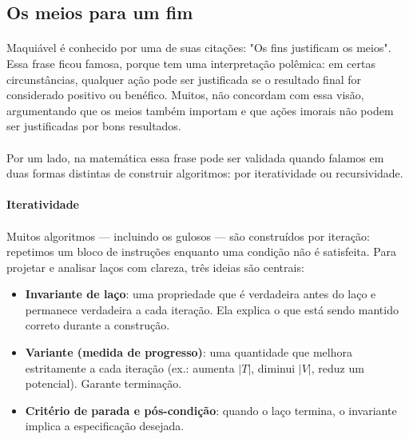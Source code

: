 \documentclass[12pt,a4paper]{article}
\def\emph#1{#1}%
\begin{document}
\subsection{Os meios para um fim}

\paragraph{}
Maquiável é conhecido por uma de suas citações: "Os fins justificam os meios". Essa frase ficou famosa, porque tem uma interpretação polêmica: em certas circunstâncias, qualquer ação pode ser justificada se o resultado final for considerado positivo ou benéfico. Muitos, não concordam com essa visão, argumentando que os meios também importam e que ações imorais não podem ser justificadas por bons resultados.

\paragraph{}
Por um lado, na matemática essa frase pode ser validada quando falamos em duas formas distintas de construir algoritmos: por \emph{iteratividade} ou \emph{recursividade}.

\paragraph{Iteratividade}
\paragraph{}
Muitos algoritmos — incluindo os gulosos — são construídos por \emph{iteração}: repetimos um bloco de instruções enquanto uma condição não é satisfeita. Para projetar e analisar laços com clareza, três ideias são centrais:

\begin{itemize}\setlength{\itemsep}{2pt}
    \item \textbf{Invariante de laço}: uma propriedade que é verdadeira antes do laço e permanece verdadeira a cada iteração. Ela explica \emph{o que} está sendo mantido correto durante a construção.
    \item \textbf{Variante (medida de progresso)}: uma quantidade que melhora estritamente a cada iteração (ex.: aumenta $|T|$, diminui $|V|$, reduz um potencial). Garante \emph{terminação}.
    \item \textbf{Critério de parada e pós-condição}: quando o laço termina, o invariante implica a especificação desejada.
\end{itemize}
\end{document}
